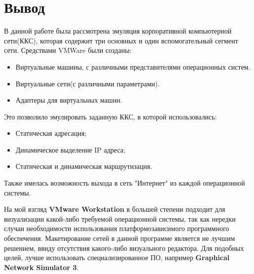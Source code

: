 \documentclass[14pt,a4paper,report]{report}
\begin{document}
\section*{Вывод}
В данной работе была рассмотрена эмуляция корпоративной компьютерной сети(ККС), которая содержит три основных и один вспомогательный сегмент сети. Средствами VMWare были созданы:
\begin{itemize}
\item Виртуальные машины, с различными представителями операционных систем.
\item Виртуальные сети(с различными параметрами).
\item Адаптеры для виртуальных машин.
\end{itemize}
Это позволило эмулировать заданную ККС, в которой использовались:
\begin{itemize}
\item Статическая адресация;
\item Динамическое выделение IP адреса;
\item Статическая и динамическая маршрутизация.
\end{itemize}
Также имелась возможность выхода в сеть "Интернет"  из каждой операционной системы.

На мой взгляд \textbf{VMware Workstation} в большей степени подходит для визуализации какой-либо требуемой операционной системы, так как нередки случаи необходимости использования платформозависимого программного обеспечения. Макетирование сетей в данной программе является не лучшим решением, ввиду отсутствия какого-либо визуального редактора. Для подобных целей, лучше использовать специализированное ПО, например \textbf{Graphical Network Simulator 3}.

%
%
\end{document}
